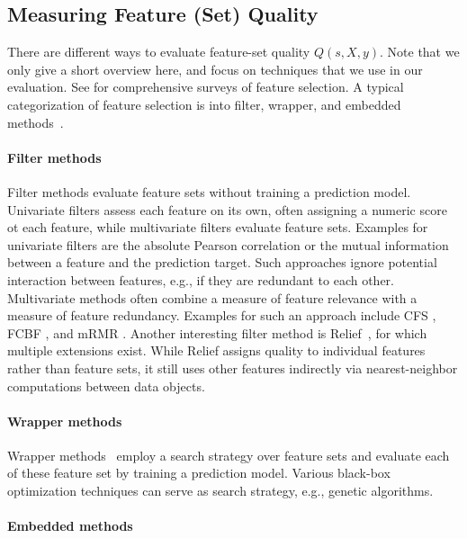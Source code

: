 \documentclass{article}
\begin{document}
\subsection{Measuring Feature (Set) Quality}

There are different ways to evaluate feature-set quality $Q(s,X,y)$.
Note that we only give a short overview here, and focus on techniques that we use in our evaluation.
See \cite{chandrashekar2014survey,li2017feature} for comprehensive surveys of feature selection.
A typical categorization of feature selection is into filter, wrapper, and embedded methods~\cite{guyon2003introduction}.

\paragraph{Filter methods}

Filter methods evaluate feature sets without training a prediction model.
Univariate filters assess each feature on its own, often assigning a numeric score ot each feature, while multivariate filters evaluate feature sets.
Examples for univariate filters are the absolute Pearson correlation or the mutual information between a feature and the prediction target.
Such approaches ignore potential interaction between features, e.g., if they are redundant to each other.
Multivariate methods often combine a measure of feature relevance with a measure of feature redundancy.
Examples for such an approach include CFS \cite{hall1999correlation}, FCBF \cite{yu2003feature}, and mRMR \cite{peng2005feature}.
Another interesting filter method is Relief~\cite{kira1992feature}, for which multiple extensions exist.
While Relief assigns quality to individual features rather than feature sets, it still uses other features indirectly via nearest-neighbor computations between data objects.

\paragraph{Wrapper methods}

Wrapper methods~\cite{kohavi1997wrappers} employ a search strategy over feature sets and evaluate each of these feature set by training a prediction model.
Various black-box optimization techniques can serve as search strategy, e.g., genetic algorithms.

\paragraph{Embedded methods}
\end{document}

